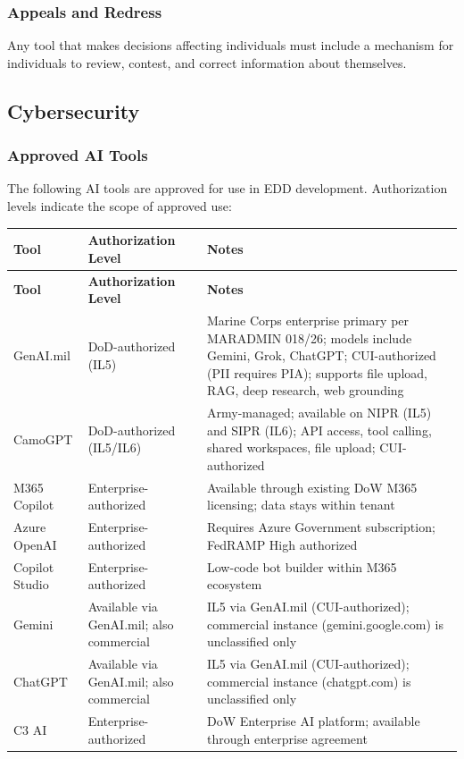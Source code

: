 \documentclass[11pt,letterpaper]{article}
\begin{document}
\subsubsection{Appeals and Redress}

Any tool that makes decisions affecting individuals must include a mechanism for
individuals to review, contest, and correct information about themselves.

\subsection{Cybersecurity}
\label{sec:cybersecurity}

\subsubsection{Approved AI Tools}
\label{sec:approved-ai-tools}

The following AI tools are approved for use in EDD development. Authorization levels
indicate the scope of approved use:

\begin{longtable}{@{}p{3cm}p{4cm}p{6.5cm}@{}}
\toprule
\textbf{Tool} & \textbf{Authorization Level} & \textbf{Notes} \\
\midrule
\endfirsthead
\toprule
\textbf{Tool} & \textbf{Authorization Level} & \textbf{Notes} \\
\midrule
\endhead
\bottomrule
\endlastfoot
GenAI.mil & DoD-authorized (IL5) & Marine Corps enterprise primary per MARADMIN 018/26; models include Gemini, Grok, ChatGPT; CUI-authorized (PII requires PIA); supports file upload, RAG, deep research, web grounding \\
\midrule
CamoGPT & DoD-authorized (IL5/IL6) & Army-managed; available on NIPR (IL5) and SIPR (IL6); API access, tool calling, shared workspaces, file upload; CUI-authorized \\
\midrule
M365 Copilot & Enterprise-authorized & Available through existing DoW M365 licensing; data stays within tenant \\
\midrule
Azure OpenAI & Enterprise-authorized & Requires Azure Government subscription; FedRAMP High authorized \\
\midrule
Copilot Studio & Enterprise-authorized & Low-code bot builder within M365 ecosystem \\
\midrule
Gemini & Available via GenAI.mil; also commercial & IL5 via GenAI.mil (CUI-authorized); commercial instance (gemini.google.com) is unclassified only \\
\midrule
ChatGPT & Available via GenAI.mil; also commercial & IL5 via GenAI.mil (CUI-authorized); commercial instance (chatgpt.com) is unclassified only \\
\midrule
C3 AI & Enterprise-authorized & DoW Enterprise AI platform; available through enterprise agreement \\
\end{longtable}
\end{document}
